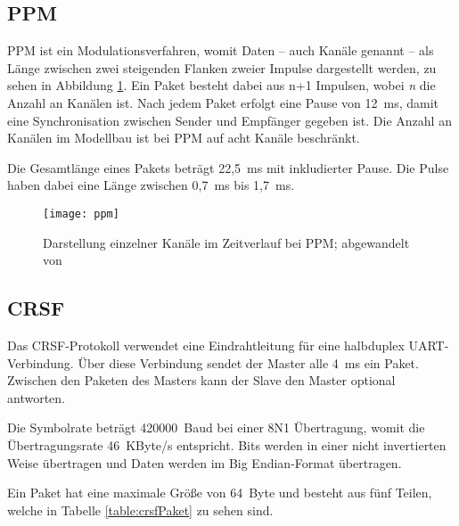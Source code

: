 \subsection{\acf{PPM}}
\ac{PPM} ist ein Modulationsverfahren, womit Daten -- auch Kanäle genannt -- als Länge zwischen zwei steigenden Flanken zweier Impulse dargestellt werden, zu sehen in Abbildung \ref{fig:ppmtime}. Ein Paket besteht dabei aus n+1 Impulsen, wobei \textit{n} die Anzahl an Kanälen ist. Nach jedem Paket erfolgt eine Pause von 12~ms, damit eine Synchronisation zwischen Sender und Empfänger gegeben ist. Die Anzahl an Kanälen im Modellbau ist bei \ac{PPM} auf acht Kanäle beschränkt. \cite{hornppm}

Die Gesamtlänge eines Pakets beträgt 22,5~ms mit inkludierter Pause. Die Pulse haben dabei eine Länge zwischen 0,7~ms bis 1,7~ms. \cite{opentxppm}

\begin{figure}[h]
    \centering
    \texttt{[image: ppm]}
    \caption{Darstellung einzelner Kanäle im Zeitverlauf bei \acs{PPM}; abgewandelt von \cite{hornppm}}
    \label{fig:ppmtime}
\end{figure}

\subsection{CRSF}
Das CRSF-Protokoll verwendet eine Eindrahtleitung für eine halbduplex \ac{UART}-Verbindung. Über diese Verbindung sendet der Master alle 4~ms ein Paket. Zwischen den Paketen des Masters kann der Slave den Master optional antworten. \cite{cleanflightCrsf}

Die Symbolrate beträgt 420000~Baud bei einer 8N1 Übertragung, womit die Übertragungsrate 46~KByte/s entspricht. Bits werden in einer nicht invertierten Weise übertragen und Daten werden im Big Endian-Format übertragen. \cite{cleanflightCrsf}

Ein Paket hat eine maximale Größe von 64~Byte und besteht aus fünf Teilen, welche in Tabelle \ref{table:crsfPaket} zu sehen sind. \cite{cleanflightCrsf}

